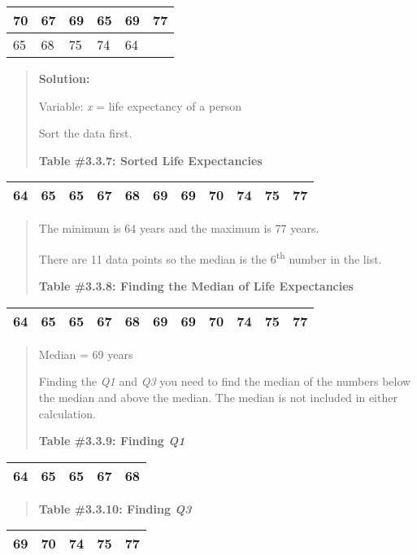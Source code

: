 \documentclass[]{book}
\begin{document}
\begin{longtable}[]{@{}llllll@{}}
\toprule
70 & 67 & 69 & 65 & 69 & 77\tabularnewline
\midrule
\endhead
65 & 68 & 75 & 74 & 64 &\tabularnewline
\bottomrule
\end{longtable}

\begin{quote}
\textbf{Solution:}

Variable: \emph{x} = life expectancy of a person

Sort the data first.

\textbf{Table \#3.3.7: Sorted Life Expectancies}
\end{quote}

\begin{longtable}[]{@{}lllllllllll@{}}
\toprule
\endhead
64 & 65 & 65 & 67 & 68 & 69 & 69 & 70 & 74 & 75 & 77\tabularnewline
\bottomrule
\end{longtable}

\begin{quote}
The minimum is 64 years and the maximum is 77 years.

There are 11 data points so the median is the 6\textsuperscript{th} number in the
list.

\textbf{Table \#3.3.8: Finding the Median of Life Expectancies}
\end{quote}

\begin{longtable}[]{@{}lllllllllll@{}}
\toprule
\endhead
64 & 65 & 65 & 67 & 68 & 69 & 69 & 70 & 74 & 75 & 77\tabularnewline
\bottomrule
\end{longtable}

\begin{quote}
Median = 69 years

Finding the \emph{Q1} and \emph{Q3} you need to find the median of the numbers
below the median and above the median. The median is not included in
either calculation.

\textbf{Table \#3.3.9: Finding \emph{Q1}}
\end{quote}

\begin{longtable}[]{@{}lllll@{}}
\toprule
\endhead
64 & 65 & 65 & 67 & 68\tabularnewline
\bottomrule
\end{longtable}

\begin{quote}
\textbf{Table \#3.3.10: Finding \emph{Q3}}
\end{quote}

\begin{longtable}[]{@{}lllll@{}}
\toprule
\endhead
69 & 70 & 74 & 75 & 77\tabularnewline
\bottomrule
\end{longtable}
\end{document}
